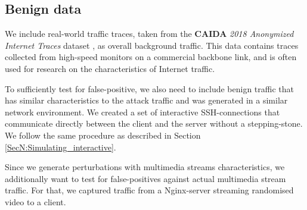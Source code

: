  
\subsection{Benign data}


We include real-world traffic traces, taken from the \textbf{CAIDA} \textit{2018 Anonymized Internet Traces} dataset \cite{CAIDA2018}, as overall background traffic. This data contains traces collected from high-speed monitors on a commercial backbone link, and is often used for research on the characteristics of Internet traffic.%


To sufficiently test for false-positive, we also need to include benign traffic that has similar characteristics to the attack traffic and was generated in a similar network environment. We created a set of interactive SSH-connections that communicate directly between the client and the server without a stepping-stone. We follow the same procedure as described in Section \ref{SecN:Simulating_interactive}.%

Since we generate perturbations with multimedia streams characteristics, we additionally want to test for false-positives against actual multimedia stream traffic. For that, we captured traffic from a Nginx-server streaming randomised video to a client.


